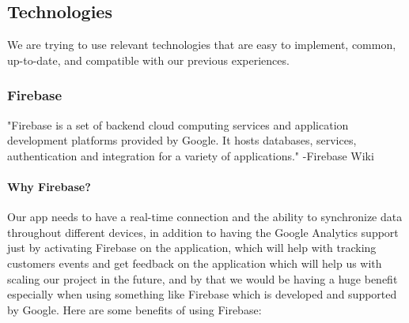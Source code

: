 \documentclass[a4paper, 12pt]{report} %
\begin{document}
        \subsection{Technologies}
            We are trying to use relevant technologies that are easy to implement, common, up-to-date, and compatible with our previous experiences.
            \subsubsection{Firebase}
                "Firebase is a set of backend cloud computing services and application development platforms provided by Google. It hosts databases, services, authentication and integration for a variety of applications." -Firebase Wiki \cite{firebase_wiki}
                
                \paragraph{Why Firebase?} 
                
                Our app needs to have a real-time connection and the ability to synchronize data throughout different devices, in addition to having the Google Analytics support just by activating Firebase on the application, which will help with tracking customers events and get feedback on the application which will help us with scaling our project in the future, and by that we would be having a  huge benefit especially when using something like Firebase which is developed and supported by Google. Here are some benefits of using Firebase:
                
\end{document}
